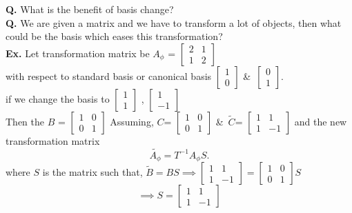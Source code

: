 \documentclass[12pt]{article}
\begin{document}
\textbf{Q.} What is the benefit of basis change?\\
\textbf{Q.} We are given a matrix and we have to transform a lot of objects, then what could be the basis which eases this transformation?\\
\textbf{Ex.} Let transformation matrix be $A_{\phi}$ = $\begin{bmatrix}
2 & 1 \\
1 & 2
\end{bmatrix}
$\\
with respect to standard basis or canonical basis 
$\begin{bmatrix}
1 \\ 0 
\end{bmatrix}$
\&\ 
$\begin{bmatrix}
0 \\ 1 
\end{bmatrix}$.\\
if we change the basis to 
$\begin{bmatrix}
    1\\1
\end{bmatrix}
$
,
$\begin{bmatrix}
    1 \\ -1
\end{bmatrix}
$ \\
Then the $B$ = 
$\begin{bmatrix}
    1 & 0 \\
    0 & 1
\end{bmatrix}
$
\newpage
Assuming, $C$=
$\begin{bmatrix}
    1 & 0\\
    0 & 1
\end{bmatrix}
$ 
\&\ $\tilde{C}$=
$\begin{bmatrix}
    1 & 1\\
    1 & -1
\end{bmatrix}
$
and the new transformation matrix \\ $$\tilde{A_{\phi}}=T^{-1}A_{\phi}S.
$$
where $S$ is the matrix such that, $\tilde{B}=BS
\implies \begin{bmatrix}
    1 & 1\\
    1 & -1
\end{bmatrix}
=
\begin{bmatrix}
    1 & 0\\
    0 & 1
\end{bmatrix}S
$
\begin{equation*}
    \implies S = 
    \begin{bmatrix}
        1 & 1\\
        1 & -1
    \end{bmatrix}
\end{equation*}
\end{document}

